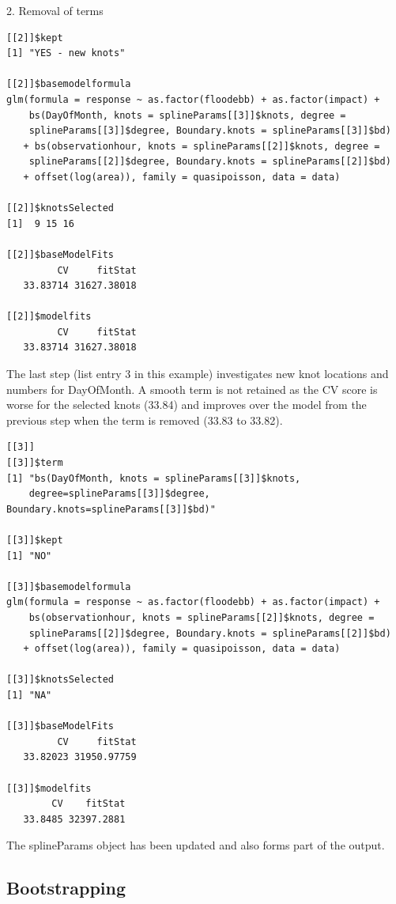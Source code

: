 \begin{block}{2. Removal of terms}
\begin{verbatim}
[[2]]$kept
[1] "YES - new knots"

[[2]]$basemodelformula
glm(formula = response ~ as.factor(floodebb) + as.factor(impact) + 
    bs(DayOfMonth, knots = splineParams[[3]]$knots, degree = 
    splineParams[[3]]$degree, Boundary.knots = splineParams[[3]]$bd) 
   + bs(observationhour, knots = splineParams[[2]]$knots, degree = 
    splineParams[[2]]$degree, Boundary.knots = splineParams[[2]]$bd) 
   + offset(log(area)), family = quasipoisson, data = data)

[[2]]$knotsSelected
[1]  9 15 16

[[2]]$baseModelFits
         CV     fitStat 
   33.83714 31627.38018 

[[2]]$modelfits
         CV     fitStat 
   33.83714 31627.38018 
\end{verbatim}
\normalsize

\noindent The last step (list entry 3 in this example)  investigates new knot locations and numbers for DayOfMonth.  A smooth term is not retained as the CV score is worse for the selected knots (33.84) and improves over the model from the previous step when the term is removed (33.83 to 33.82).

\footnotesize
\begin{verbatim}
[[3]]
[[3]]$term
[1] "bs(DayOfMonth, knots = splineParams[[3]]$knots, 
    degree=splineParams[[3]]$degree, Boundary.knots=splineParams[[3]]$bd)"

[[3]]$kept
[1] "NO"

[[3]]$basemodelformula
glm(formula = response ~ as.factor(floodebb) + as.factor(impact) + 
    bs(observationhour, knots = splineParams[[2]]$knots, degree = 
    splineParams[[2]]$degree, Boundary.knots = splineParams[[2]]$bd) 
   + offset(log(area)), family = quasipoisson, data = data)

[[3]]$knotsSelected
[1] "NA"

[[3]]$baseModelFits
         CV     fitStat 
   33.82023 31950.97759 

[[3]]$modelfits
        CV    fitStat 
   33.8485 32397.2881 
\end{verbatim}
\normalsize

\noindent The splineParams object has been updated and also forms part of the output.

\end{block}

\subsection{Bootstrapping}

